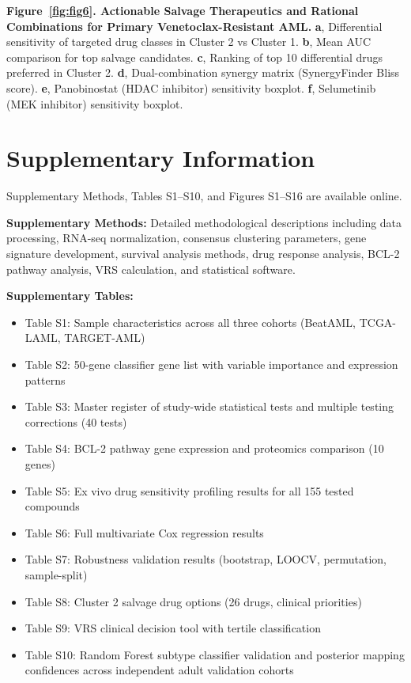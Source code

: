 \documentclass[11pt,a4paper]{article}
\begin{document}
\textbf{Figure~\ref{fig:fig6}. Actionable Salvage Therapeutics and Rational Combinations for Primary Venetoclax-Resistant AML.} \textbf{a}, Differential sensitivity of targeted drug classes in Cluster 2 vs Cluster 1. \textbf{b}, Mean AUC comparison for top salvage candidates. \textbf{c}, Ranking of top 10 differential drugs preferred in Cluster 2. \textbf{d}, Dual-combination synergy matrix (SynergyFinder Bliss score). \textbf{e}, Panobinostat (HDAC inhibitor) sensitivity boxplot. \textbf{f}, Selumetinib (MEK inhibitor) sensitivity boxplot.

\section*{Supplementary Information}

Supplementary Methods, Tables S1--S10, and Figures S1--S16 are available online.

\textbf{Supplementary Methods:} Detailed methodological descriptions including data processing, RNA-seq normalization, consensus clustering parameters, gene signature development, survival analysis methods, drug response analysis, BCL-2 pathway analysis, VRS calculation, and statistical software.

\textbf{Supplementary Tables:}
\begin{itemize}
\item Table S1: Sample characteristics across all three cohorts (BeatAML, TCGA-LAML, TARGET-AML)
\item Table S2: 50-gene classifier gene list with variable importance and expression patterns
\item Table S3: Master register of study-wide statistical tests and multiple testing corrections (40 tests)
\item Table S4: BCL-2 pathway gene expression and proteomics comparison (10 genes)
\item Table S5: Ex vivo drug sensitivity profiling results for all 155 tested compounds
\item Table S6: Full multivariate Cox regression results
\item Table S7: Robustness validation results (bootstrap, LOOCV, permutation, sample-split)
\item Table S8: Cluster 2 salvage drug options (26 drugs, clinical priorities)
\item Table S9: VRS clinical decision tool with tertile classification
\item Table S10: Random Forest subtype classifier validation and posterior mapping confidences across independent adult validation cohorts
\end{itemize}
\end{document}
